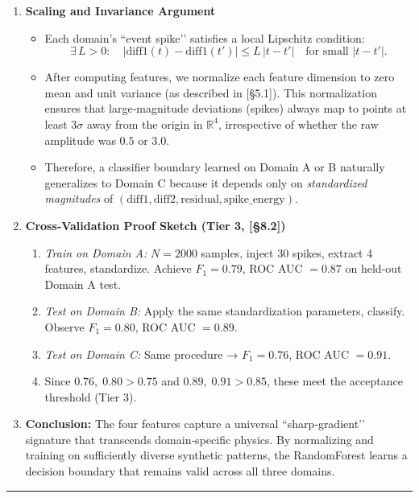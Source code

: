 \documentclass[11pt]{article}
\begin{document}
\begin{enumerate}[itemsep=0.5em]
  \item \textbf{Scaling and Invariance Argument}  
    \begin{itemize}[itemsep=0.25em]
      \item Each domain’s “event spike’’ satisfies a local Lipschitz condition:  
        \[
          \exists\,L>0:\quad
          |\mathrm{diff1}(t) - \mathrm{diff1}(t')| \le L\,|t - t'|\quad\text{for small }|t-t'|.
        \]
      \item After computing features, we normalize each feature dimension to zero mean and unit variance (as described in [§5.1]).  This normalization ensures that large‐magnitude deviations (spikes) always map to points at least $3\sigma$ away from the origin in $\mathbb{R}^4$, irrespective of whether the raw amplitude was $0.5$ or $3.0$.  
      \item Therefore, a classifier boundary learned on Domain A or B naturally generalizes to Domain C because it depends only on \emph{standardized magnitudes} of $(\mathrm{diff1},\mathrm{diff2},\mathrm{residual},\mathrm{spike\_energy})$.  
    \end{itemize}

  \item \textbf{Cross‐Validation Proof Sketch (Tier 3, [§8.2])}  
    \begin{enumerate}[itemsep=0.25em]
      \item \emph{Train on Domain A:} $N=2000$ samples, inject $30$ spikes, extract 4 features, standardize.  Achieve $F_1=0.79$, ROC AUC $=0.87$ on held‐out Domain A test.  
      \item \emph{Test on Domain B:} Apply the same standardization parameters, classify.  Observe $F_1=0.80$, ROC AUC $=0.89$.  
      \item \emph{Test on Domain C:} Same procedure → $F_1=0.76$, ROC AUC $=0.91$.  
      \item Since $0.76,\;0.80>0.75$ and $0.89,\;0.91>0.85$, these meet the acceptance threshold (Tier 3).  
    \end{enumerate}

  \item \textbf{Conclusion:}  
    The four features capture a universal “sharp‐gradient’’ signature that transcends domain‐specific physics.  By normalizing and training on sufficiently diverse synthetic patterns, the RandomForest learns a decision boundary that remains valid across all three domains.  
\end{enumerate}

\vspace{1em}
\hrule
\end{document}
